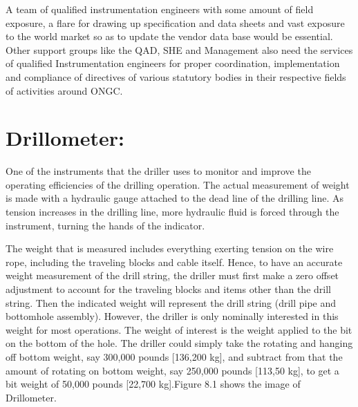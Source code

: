\vspace{1em}
A team of qualified instrumentation engineers with some amount of field exposure, 
a flare for drawing up specification and data sheets and vast exposure to the world market 
so as to update the vendor data base would be essential. Other support groups like the QAD, 
SHE and Management also need the services of qualified Instrumentation engineers for proper coordination, 
implementation and compliance of directives of various statutory bodies in their respective fields of 
activities around ONGC.

\section*{Drillometer:} 

One of the instruments that the driller uses to monitor
and improve the operating efficiencies of the drilling operation. The
actual measurement of weight is made with a hydraulic gauge
attached to the dead line of the drilling line. As tension increases in
the drilling line, more hydraulic fluid is forced through the
instrument, turning the hands of the indicator. 

\vspace{2em}

The weight that is measured includes everything exerting tension on the wire rope,
including the traveling blocks and cable itself. Hence, to have an
accurate weight measurement of the drill string, the driller must first
make a zero offset adjustment to account for the traveling blocks and
items other than the drill string. Then the indicated weight will
represent the drill string (drill pipe and bottomhole assembly).
However, the driller is only nominally interested in this weight for
most operations. The weight of interest is the weight applied to the
bit on the bottom of the hole. The driller could simply take the
rotating and hanging off bottom weight, say 300,000 pounds
[136,200 kg], and subtract from that the amount of rotating on bottom
weight, say 250,000 pounds [113,50 kg], to get a bit weight of
50,000 pounds [22,700 kg].Figure 8.1 shows the image of Drillometer.

\vspace{2em}

